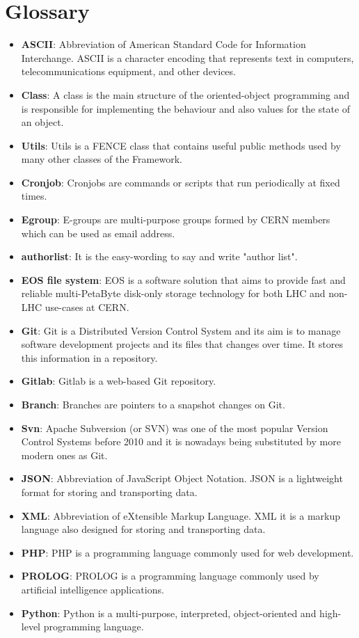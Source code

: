 \section*{Glossary}
\label{sec:Glossary}

\begin{itemize}
\item \textbf{ASCII}: Abbreviation of American Standard Code for Information Interchange. ASCII is a character encoding that represents text in computers, telecommunications equipment\textbf{}, and other devices.
\item \textbf{Class}: A class is the main structure of the oriented-object programming and is responsible for implementing the behaviour and also values for the state of an object.
\item \textbf{Utils}: Utils is a FENCE class that contains useful public methods used by many other classes of the Framework.
\item \textbf{Cronjob}: Cronjobs are commands or scripts that run periodically at fixed times.
\item \textbf{Egroup}: E-groups are multi-purpose groups formed by CERN members which can be used as email address.
\item \textbf{authorlist}: It is the easy-wording to say and write "author list". 
\item \textbf{EOS file system}: EOS is a software solution that aims to provide fast and reliable multi-PetaByte disk-only storage technology for both LHC and non-LHC use-cases at CERN.
\item \textbf{Git}: Git is a Distributed Version Control System and its aim is to manage software development projects and its files that changes over time. It stores this information in a repository.
\item \textbf{Gitlab}: Gitlab is a web-based Git repository.
\item \textbf{Branch}: Branches are pointers to a snapshot changes on Git.
\item \textbf{Svn}: Apache Subversion (or SVN) was one of the most popular Version Control Systems before 2010 and it is nowadays being substituted by more modern ones as Git.
\item \textbf{JSON}: Abbreviation of JavaScript Object Notation. JSON is a lightweight format for storing and transporting data.
\item \textbf{XML}: Abbreviation of eXtensible Markup Language. XML it is a markup language also designed for storing and transporting data.
\item \textbf{PHP}: PHP is a programming language commonly used for web development.
\item \textbf{PROLOG}: PROLOG is a programming language commonly used by artificial intelligence applications.
\item \textbf{Python}: Python is a multi-purpose, interpreted, object-oriented and high-level programming language.
\end{itemize}